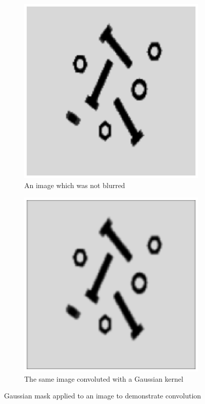 \begin{figure}[!htb]
 \centering
 \begin{subfigure}[b]{0.49\linewidth}
  \includegraphics[width=\textwidth]{notBlurred.eps} 
  \caption{An image which was not blurred}
  \label{fig:nonblur} 
 \end{subfigure}
 \begin{subfigure}[b]{0.49\linewidth}
  \includegraphics[width=\textwidth]{blurred.eps}
  \caption{The same image convoluted with a Gaussian kernel}
  \label{fig:blur}
 \end{subfigure}
 \caption{Gaussian mask applied to an image to demonstrate convolution}
\end{figure}
